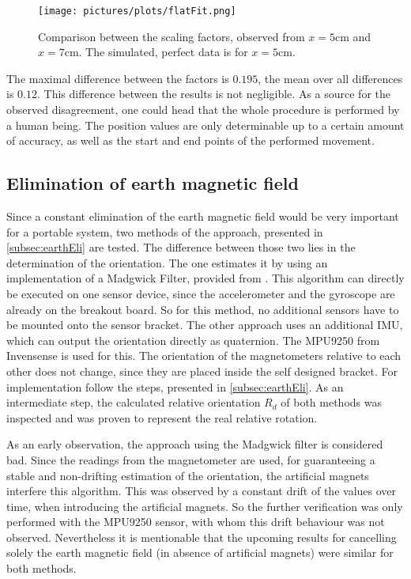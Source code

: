 \begin{figure}[h]
\texttt{[image: pictures/plots/flatFit.png]}
\caption{Comparison between the scaling factors, observed from $ x=5\si{\cm} $ and $ x=7\si{\cm} $. The simulated, perfect data is for $ x=5\si{\cm} $.}
\label{fig:flatFit}
\end{figure}

The maximal difference between the factors is $ 0.195 $, the mean over all differences is $ 0.12 $. This difference between the results is not negligible. As a source for the observed disagreement, one could head that the whole procedure is performed by a human being. The position values are only determinable up to a certain amount of accuracy, as well as the start and end points of the performed movement.


\subsection{Elimination of earth magnetic field} \label{subsec:resEarthEli}

Since a constant elimination of the earth magnetic field would be very important for a portable system, two methods of the approach, presented in \ref{subsec:earthEli} are tested. The difference between those two lies in the determination of the orientation. The one estimates it by using an implementation of a Madgwick Filter, provided from \cite{mikeshub2012}. This algorithm can directly be executed on one sensor device, since the accelerometer and the gyroscope are already on the breakout board. So for this method, no additional sensors have to be mounted onto the sensor bracket. The other approach uses an additional \ac{IMU}, which can output the orientation directly as quaternion. The MPU9250 from Invensense \cite{MPU2014} is used for this. The orientation of the magnetometers relative to each other does not change, since they are placed inside the self designed bracket. For implementation follow the steps, presented in \ref{subsec:earthEli}. As an intermediate step, the calculated relative orientation $ R_{d} $ of both methods was inspected and was proven to represent the real relative rotation.

As an early observation, the approach using the Madgwick filter is considered bad. Since the readings from the magnetometer are used, for guaranteeing a stable and non-drifting estimation of the orientation, the artificial magnets interfere this algorithm. This was observed by a constant drift of the values over time, when introducing the artificial magnets. So the further verification was only performed with the MPU9250 sensor, with whom this drift behaviour was not observed. Nevertheless it is mentionable that the upcoming results for cancelling solely the earth magnetic field (in absence of artificial magnets) were similar for both methods.

